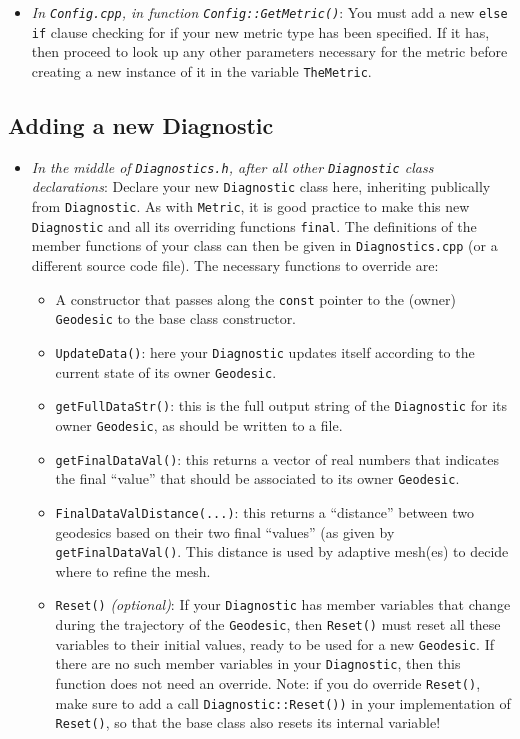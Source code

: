 \documentclass[11pt,a4paper]{article}
\newcommand{\code}[1]{{\tt #1}}
\begin{document}
\begin{itemize}
 
 \item[B.] \emph{In \code{Config.cpp}, in function \code{Config::GetMetric()}}: You must add a new \code{else if} clause checking for if your new metric type has been specified. If it has, then proceed to look up any other parameters necessary for the metric before creating a new instance of it in the variable \code{TheMetric}.
\end{itemize}


\subsection{Adding a new Diagnostic}

\begin{itemize}
 \item[A.1.] \emph{In the middle of \code{Diagnostics.h}, after all other \code{Diagnostic} class declarations}: Declare your new \code{Diagnostic} class here, inheriting publically from \code{Diagnostic}. As with \code{Metric}, it is good practice to make this new \code{Diagnostic} and all its overriding functions \code{final}. The definitions of the member functions of your class can then be given in \code{Diagnostics.cpp} (or a different source code file). The necessary functions to override are:
 \begin{itemize}
 \item A constructor that passes along the \code{const} pointer to the (owner) \code{Geodesic} to the base class constructor.
 \item \code{UpdateData()}: here your \code{Diagnostic} updates itself according to the current state of its owner \code{Geodesic}.
 \item \code{getFullDataStr()}: this is the full output string of the \code{Diagnostic} for its owner \code{Geodesic}, as should be written to a file.
 \item \code{getFinalDataVal()}: this returns a vector of real numbers that indicates the final ``value'' that should be associated to its owner \code{Geodesic}.
 \item \code{FinalDataValDistance(...)}: this returns a ``distance'' between two geodesics based on their two final ``values'' (as given by \code{getFinalDataVal()}. This distance is used by adaptive mesh(es) to decide where to refine the mesh.
 \item \code{Reset()} \emph{(optional)}: If your \code{Diagnostic} has member variables that change during the trajectory of the \code{Geodesic}, then \code{Reset()} must reset all these variables to their initial values, ready to be used for a new \code{Geodesic}. If there are no such member variables in your \code{Diagnostic}, then this function does not need an override. Note: if you do override \code{Reset()}, make sure to add a call \code{Diagnostic::Reset())} in your implementation of \code{Reset()}, so that the base class also resets its internal variable!

\end{itemize}
\end{itemize}
\end{document}
